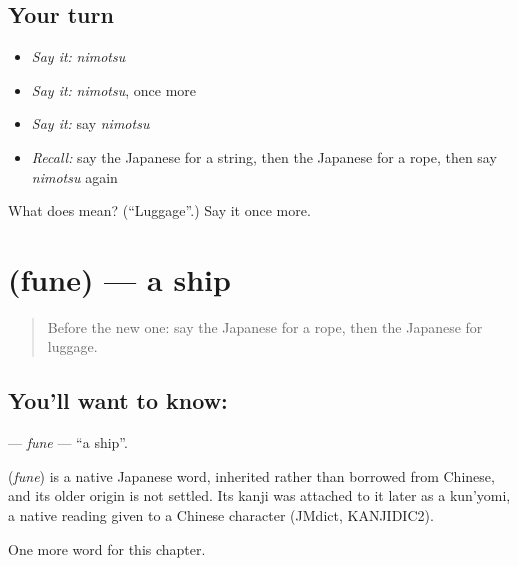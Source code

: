 \subsection*{Your turn}
\begin{itemize}
\raggedright
  \item \emph{Say it:} \emph{nimotsu}
  \item \emph{Say it:} \emph{nimotsu}, once more
  \item \emph{Say it:} say \emph{nimotsu}
  \item \emph{Recall:} say the Japanese for a string, then the Japanese for a rope, then say \emph{nimotsu} again
\end{itemize}

\begin{tcolorbox}[breakable,colback=teal!4,colframe=teal!35!black,title={Before you move on}]
What does  mean? (\textquotedblleft{}Luggage\textquotedblright{}.) Say it once more.
\end{tcolorbox}
\section[\texorpdfstring{\ja{ふね} (fune)}{ふね (fune)}]{ (fune) — a ship}

\label{lesson:JA-C62-fune}



\begin{quote}
Before the new one: say the Japanese for a rope, then the Japanese for luggage.
\end{quote}

\subsection*{You'll want to know: }
\textbf{} — \emph{fune} — \textquotedblleft{}a ship\textquotedblright{}.

\begin{cousinweb}
\textbf{} (\emph{fune}) is a native Japanese word, inherited rather than borrowed from Chinese, and its older origin is not settled. Its kanji was attached to it later as a kun'yomi, a native reading given to a Chinese character (JMdict, KANJIDIC2).
\end{cousinweb}

\begin{grammarlens}[title={What you've built}]
One more word for this chapter.
\end{grammarlens}

